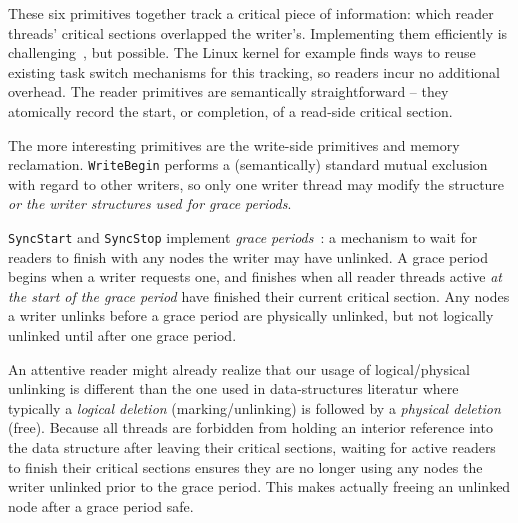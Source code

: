 These six primitives together track a critical piece of information: which reader threads' critical sections overlapped the writer's.
Implementing them efficiently is challenging~\cite{urcu_ieee}, but possible.
The Linux kernel for example finds ways to reuse existing task switch mechanisms for this tracking, so readers incur no additional overhead.
The reader primitives are semantically straightforward -- they atomically record the start, or completion, of a read-side critical section. %

The more interesting primitives are the write-side primitives and memory reclamation.
\lstinline|WriteBegin| performs a (semantically) standard mutual exclusion with regard to other writers, so only one writer thread may modify the structure \emph{or the writer structures used for grace periods}. %

\lstinline|SyncStart| and \lstinline|SyncStop| implement \emph{grace periods}~\cite{grc}: a mechanism to wait for readers to finish with any nodes the writer may have unlinked.  A grace period begins when a writer requests one, and finishes when all reader threads active \emph{at the start of the grace period} have finished their current critical section.
Any nodes a writer unlinks before a grace period are physically unlinked, but not logically unlinked until after one grace period.

An attentive reader might already realize that our usage of logical/physical unlinking is different than the one used in data-structures literatur where typically a \textit{logical deletion} (marking/unlinking) is followed by a \textit{physical deletion} (free).
Because all threads are forbidden from holding an interior reference into the data structure after leaving their critical sections, waiting for active readers to finish their critical sections ensures they are no longer using any nodes the writer unlinked prior to the grace period.
This makes actually freeing an unlinked node after a grace period safe.

